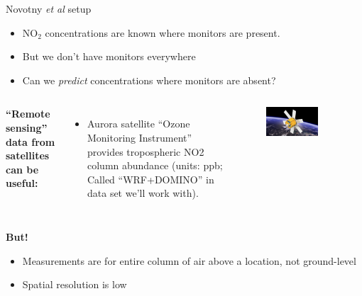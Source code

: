 \documentclass[aspectratio=169, handout]{beamer}
\begin{document}
\begin{frame}{Novotny \textit{et al} setup}

\begin{itemize}
\item NO$_2$ concentrations are known where monitors are present.  
\item But we don't have monitors everywhere
\item Can we \textit{predict} concentrations where monitors are absent?
\end{itemize}

\pause
\begin{columns}
\textbf{``Remote sensing'' data from satellites can be useful:}
\begin{itemize}
\item Aurora satellite ``Ozone Monitoring Instrument'' provides tropospheric NO2 column abundance (units: ppb; Called ``WRF+DOMINO'' in data set we'll work with).
\end{itemize}

\begin{figure}
\includegraphics[width=0.75\textwidth]{aurora}
\caption*{}
\end{figure}
\end{columns}


\pause
\textbf{But!}
\begin{itemize}
\item Measurements are for entire column of air above a location, not ground-level
\item Spatial resolution is low
\end{itemize}

\end{frame}
\end{document}
